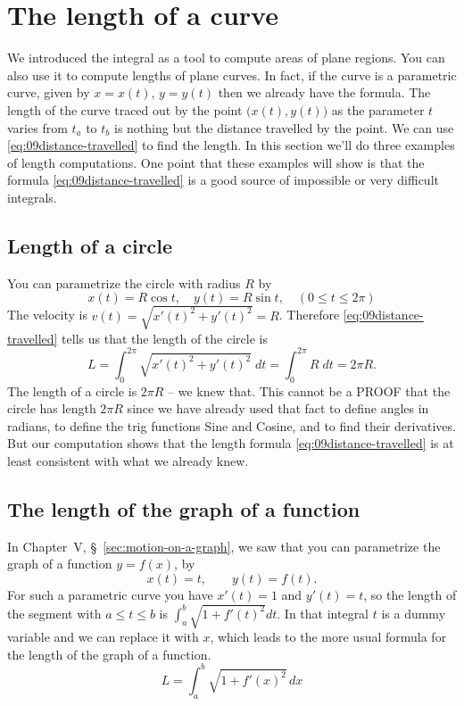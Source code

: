 \section{The length of a curve}
We introduced the integral as a tool to compute areas of plane regions.  You can
also use it to compute lengths of plane curves.  In fact, if the curve is a
parametric curve, given by $x=x(t)$, $y=y(t)$ then we already have the formula.
The length of the curve traced out by the point $\bigl(x(t), y(t)\bigr)$ as the
parameter $t$ varies from $t_a$ to $t_b$ is nothing but the distance travelled
by the point.  We can use \eqref{eq:09distance-travelled} to find the length.
In this section we'll do three examples of length computations.  One point that
these examples will show is that the formula \eqref{eq:09distance-travelled}
is a good source of impossible or very difficult integrals.


\subsection{Length of a circle}
You can parametrize the circle with radius $R$ by
\[
x(t) = R\cos t, \quad y(t)=R\sin t,\quad (0\leq t\leq 2\pi)
\]
The velocity is $v(t) = \sqrt{x'(t)^2+y'(t)^2} = R$.
Therefore \eqref{eq:09distance-travelled} tells us that the length of the
circle is
\marginpar{\footnotesize }%
\[
L = \int_0^{2\pi}\sqrt{x'(t)^2+y'(t)^2}\;dt = \int_0^{2\pi} R\;dt = 2\pi R.
\]
The length of a circle is $2\pi R$ -- we knew that.
This cannot be a PROOF that the circle has length $2\pi R$ since we have
already used that fact to define angles in radians, to define the trig functions
Sine and Cosine, and to find their derivatives.  But our computation shows that
the length formula \eqref{eq:09distance-travelled} is at least consistent with
what we already knew.

\subsection{The length of the graph of a function}
In Chapter~V, \S~\ref{sec:motion-on-a-graph}, we saw that you can parametrize
the graph of a function $y=f(x)$, by
\[
  x(t) = t, \qquad y(t) = f(t).
\]%
\marginpar{\def\svgwidth{90pt}%
\footnotesize\sffamily%

}%
For such a parametric curve you have $x'(t) = 1$ and $y'(t) = t$, so the length
of the segment with $a\leq t\leq b$ is $\int_a^b \sqrt{1+f'(t)^2} dt$.  In that
integral $t$ is a dummy variable and we can replace it with $x$, which leads to
the more usual formula for the length of the graph of a function.
\begin{equation}
  L = \int_a^b \sqrt{1+f'(x)^2}\, dx
  \label{eq:09length-of-graph-of-f}
\end{equation}

